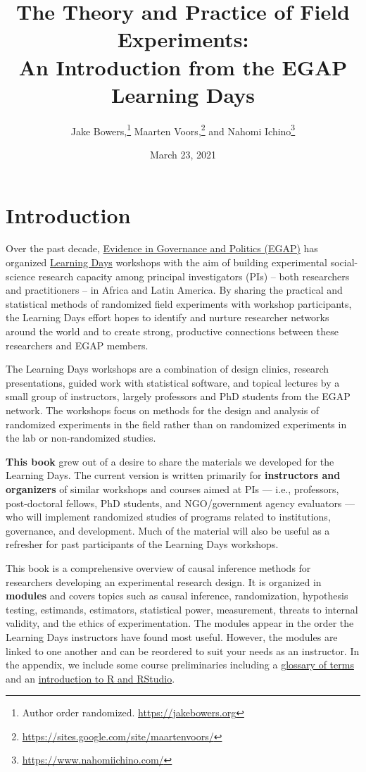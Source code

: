 \documentclass[12pt,]{book}
\title{The Theory and Practice of Field Experiments:\\
An Introduction from the EGAP Learning Days}
\author{Jake Bowers,\footnote{Author order randomized. \url{https://jakebowers.org}} Maarten Voors,\footnote{\url{https://sites.google.com/site/maartenvoors/}} and Nahomi Ichino\footnote{\url{https://www.nahomiichino.com/}}}
\date{March 23, 2021}
\begin{document}
\maketitle

\captionsetup[table]{list=no}
\captionsetup[figure]{list=no}

{
\hypersetup{linkcolor=}
\setcounter{tocdepth}{1}
\tableofcontents
}
\hypertarget{introduction}{%
\chapter{Introduction}\label{introduction}}

Over the past decade, \href{http://egap.org/}{Evidence in Governance and Politics (EGAP)} has organized \href{https://egap.org/learning-days/}{Learning Days} workshops with the aim of building experimental social-science research capacity among principal investigators (PIs) -- both researchers and practitioners -- in Africa and Latin America. By sharing the practical and statistical methods of randomized field experiments with workshop participants, the Learning Days effort hopes to identify and nurture researcher networks around the world and to create strong, productive connections between these researchers and EGAP members.

The Learning Days workshops are a combination of design clinics, research presentations, guided work with statistical software, and topical lectures by a small group of instructors, largely professors and PhD students from the EGAP network. The workshops focus on methods for the design and analysis of randomized experiments in the field rather than on randomized experiments in the lab or non-randomized studies.

\textbf{This book} grew out of a desire to share the materials we developed for the Learning Days. The current version is written primarily for \textbf{instructors and organizers} of similar workshops and courses aimed at PIs --- i.e., professors, post-doctoral fellows, PhD students, and NGO/government agency evaluators --- who will implement randomized studies of programs related to institutions, governance, and development. Much of the material will also be useful as a refresher for past participants of the Learning Days workshops.

This book is a comprehensive overview of causal inference methods for researchers developing an experimental research design. It is organized in \textbf{modules} and covers topics such as causal inference, randomization, hypothesis testing, estimands, estimators, statistical power, measurement, threats to internal validity, and the ethics of experimentation. The modules appear in the order the Learning Days instructors have found most useful. However, the modules are linked to one another and can be reordered to suit your needs as an instructor. In the appendix, we include some course preliminaries including a \href{glossary-of-terms.html}{glossary of terms} and an \href{introduction-to-r-and-rstudio.html}{introduction to R and RStudio}.
\end{document}
